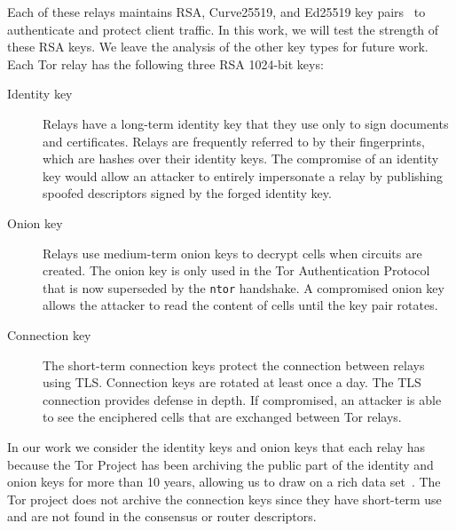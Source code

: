 Each of these relays maintains RSA, Curve25519, and Ed25519 key
pairs~\cite[\S~1.1]{torspec} to authenticate and protect client traffic. In this
work, we will test the strength of these RSA keys.  We leave the analysis of the
other key types for future work.  Each Tor relay has the following three RSA
1024-bit keys:

\begin{description}
    \item[Identity key] Relays have a long-term identity key that they use only
      to sign documents and certificates.  Relays are frequently referred to by
      their fingerprints, which are hashes over their identity keys.  The
      compromise of an identity key would allow an attacker to entirely
      impersonate a relay by publishing spoofed descriptors signed by the
      forged identity key.

    \item[Onion key]  Relays use medium-term onion keys to decrypt cells when
        circuits are created.  The onion key is only used in the Tor
        Authentication Protocol that is now superseded by the \texttt{ntor} 
        handshake.  A compromised onion key allows the attacker to read 
        the content of cells until the key pair rotates.

    \item[Connection key] The short-term connection keys protect the connection
        between relays using TLS.  Connection keys are rotated at least once a
        day.  The TLS connection provides defense in depth.  If compromised, an
        attacker is able to see the enciphered cells that are exchanged between Tor
        relays.
\end{description}

In our work we consider the identity keys and onion keys that each relay 
has because the Tor Project has been archiving the public part of the 
identity and onion keys for more than 10 years, allowing us to draw on a 
rich data set~\cite{collector}. The Tor project does not archive the 
connection keys since they have short-term use and are not found
in the consensus or router descriptors.


